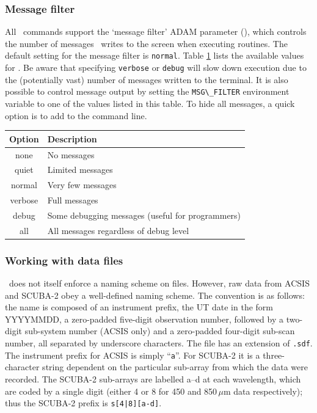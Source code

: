 \documentclass[oneside,11pt]{starlink}
\begin{document}
\subsubsection{Message filter}

All \SMURF\ commands support the `message filter' ADAM parameter
(), which controls the number of messages \SMURF\
writes to the screen when executing routines. The default setting for
the message filter is \verb+normal+. Table \ref{tab:msgfilter} lists
the available values for \aparam{MSG\_FILTER}. Be aware that specifying
\verb+verbose+ or \verb+debug+ will slow down execution due to the
(potentially vast) number of messages written to the terminal. It is
also possible to control message output by setting the
\verb+MSG\_FILTER+ environment variable to one of the values listed in
this table. To hide all messages, a quick option is to add 
to the command line.

\begin{table}
\centering
\begin{tabular}{|c|l|}
\hline
Option  & Description \\
\hline
none    & No messages \\
quiet   & Limited messages \\
normal  & Very few messages \\
verbose & Full messages \\
debug   & Some debugging messages (useful for programmers) \\
all     & All messages regardless of debug level \\
\hline
\end{tabular}
\label{tab:msgfilter}
\end{table}

\subsubsection{Working with data files\label{se:files}}

\SMURF\ does not itself enforce a naming scheme on files. However, raw
data from ACSIS and SCUBA-2 obey a well-defined naming scheme. The
convention is as follows: the name is composed of an instrument
prefix, the UT date in the form YYYYMMDD, a zero-padded five-digit
observation number, followed by a two-digit sub-system number (ACSIS
only) and a zero-padded four-digit sub-scan number, all separated by
underscore characters. The file has an extension of \verb+.sdf+. The
instrument prefix for ACSIS is simply ``\verb+a+''. For SCUBA-2 it is a
three-character string dependent on the particular sub-array from which
the data were recorded. The SCUBA-2 sub-arrays are labelled a--d at
each wavelength, which are coded by a single digit (either 4 or 8 for
450 and 850\,$\mu$m data respectively); thus the SCUBA-2 prefix is
\verb+s[4|8][a-d]+.
\end{document}
